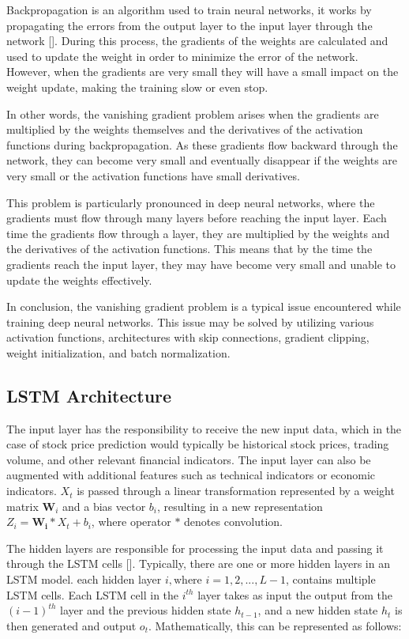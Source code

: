 \documentclass[a4paper]{article}
\begin{document}
Backpropagation is an algorithm used to train neural networks, it works by propagating the errors from the output layer to the input layer through the network [\cite{rumelhart1985learning}]. During this process, the gradients of the weights are calculated and used to update the weight in order to minimize the error of the network. However, when the gradients are very small they will have a small impact on the weight update, making the training slow or even stop.

In other words, the vanishing gradient problem arises when the gradients are multiplied by the weights themselves and the derivatives of the activation functions during backpropagation. As these gradients flow backward through the network, they can become very small and eventually disappear if the weights are very small or the activation functions have small derivatives.

This problem is particularly pronounced in deep neural networks, where the gradients must flow through many layers before reaching the input layer.  Each time the gradients
flow through a layer, they are multiplied by the weights and the derivatives of the
activation functions. This means that by the time the gradients reach the input layer, they may have become very small and unable to update the weights effectively.

In conclusion, the vanishing gradient problem is a typical issue encountered while training deep neural networks. This issue may be solved by utilizing various activation functions, architectures with skip connections, gradient clipping, weight initialization, and batch normalization.
\subsection{LSTM Architecture} \label{lstm architecture}
The input layer has the responsibility to receive the new input data, which in the case of stock price prediction would typically be historical stock prices, trading volume, and other relevant financial indicators. The input layer can also be augmented with additional features such as technical indicators or economic indicators. $X_t$ is passed through a linear transformation represented by a weight matrix $\mathbf{W}_i$ and a bias vector $b_i$, resulting in a new representation $Z_i = \mathbf{W_i} * X_t + b_i$, where operator $*$ denotes convolution.

The hidden layers are responsible for processing the input data and passing it through the LSTM cells [\cite{hochreiter1997long}]. Typically, there are one or more hidden layers in an LSTM model. each hidden layer $i, \text{where } i = 1, 2, ..., L-1$, contains multiple LSTM cells. Each LSTM cell in the $i^{th}$ layer takes as input the output from the $(i-1)^{th}$ layer and the previous hidden state $h_{t-1}$, and a new hidden state $h_t$ is then generated and output $o_t$. Mathematically, this can be represented as follows:
\end{document}
